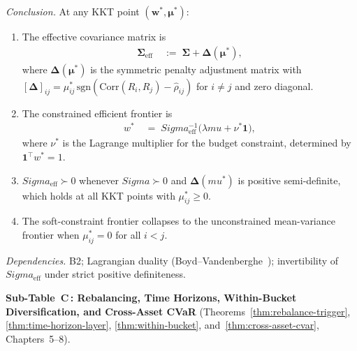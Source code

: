 \documentclass[12pt,openany]{book}
\newcommand{\bfw}{\mathbf{w}}
\newcommand{\bfmu}{\boldsymbol{\mu}}
\newcommand{\bfSigma}{\boldsymbol{\Sigma}}
\newcommand{\bfone}{\mathbf{1}}
\numberwithin{equation}{chapter}
\theoremstyle{plain}
\theoremstyle{definition}
\theoremstyle{remark}
\def\bfw{w}%
\def\bfmu{mu}%
\def\bfSigma{Sigma}%
\begin{document}
\begin{enumerate}[label=\textbf{B\arabic*.}, leftmargin=*, widest=B3,
                  itemsep=6pt, parsep=2pt]
        \emph{Conclusion.}
        At any KKT point $(\mathbf{w}^*,\boldsymbol{\mu}^*)$:
        \begin{enumerate}[label=(\alph*), itemsep=2pt]
          \item The effective covariance matrix is
                \begin{align}
                  \boldsymbol{\Sigma}_{\mathrm{eff}}
                    &\;:=\;
                      \boldsymbol{\Sigma}
                      + \boldsymbol{\Delta}(\boldsymbol{\mu}^*),
                  \label{eq:sum-sigma-eff}
                \end{align}
                where $\boldsymbol{\Delta}(\boldsymbol{\mu}^*)$ is the symmetric penalty
                adjustment matrix with
                $[\boldsymbol{\Delta}]_{ij} = \mu^*_{ij}\,\mathrm{sgn}(\mathrm{Corr}(R_i,R_j)
                - \hat{\rho}_{ij})$ for $i \neq j$ and zero diagonal.
          \item The constrained efficient frontier is
                \begin{align}
                  \bfw^*
                    &\;=\;
                      \bfSigma_{\mathrm{eff}}^{-1}
                      \bigl(
                        \lambda\bfmu
                        + \nu^*\bfone
                      \bigr),
                  \label{eq:sum-soft-opt}
                \end{align}
                where $\nu^*$ is the Lagrange multiplier for the
                budget constraint, determined by
                $\bfone^\top\bfw^* = 1$.
          \item $\bfSigma_{\mathrm{eff}} \succ 0$ whenever
                $\bfSigma \succ 0$ and $\boldsymbol{\Delta}(\bfmu^*)$ is
                positive semi-definite, which holds at all KKT points
                with $\mu^*_{ij} \geq 0$.
          \item The soft-constraint frontier collapses to the
                unconstrained mean-variance frontier when
                $\mu^*_{ij} = 0$ for all $i < j$.
        \end{enumerate}

        \emph{Dependencies.} B2; Lagrangian duality
        (Boyd--Vandenberghe~\cite{Boyd2004}); invertibility of
        $\bfSigma_{\mathrm{eff}}$ under strict positive definiteness.

\end{enumerate}

\bigskip
\noindent\textbf{Sub-Table~C\,: Rebalancing, Time Horizons,
Within-Bucket Diversification, and Cross-Asset CVaR}
(Theorems~\ref{thm:rebalance-trigger},
\ref{thm:time-horizon-layer},
\ref{thm:within-bucket},
and~\ref{thm:cross-asset-cvar}, Chapters~5--8).
\end{document}
